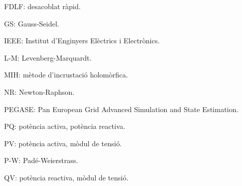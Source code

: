 FDLF: desacoblat ràpid.

GS: Gauss-Seidel.

IEEE: Institut d'Enginyers Elèctrics i Electrònics.

L-M: Levenberg-Marquardt.

MIH: mètode d'incrustació holomòrfica. %

NR: Newton-Raphson. 

PEGASE: Pan European Grid Advanced Simulation and State Estimation.

PQ: potència activa, potència reactiva.

PV: potència activa, mòdul de tensió.

P-W: Padé-Weierstrass.

QV: potència reactiva, mòdul de tensió.

